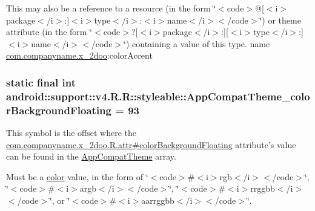 This may also be a reference to a resource (in the form \char`\"{}$<$code$>$@\mbox{[}$<$i$>$package$<$/i$>$:\mbox{]}$<$i$>$type$<$/i$>$:$<$i$>$name$<$/i$>$$<$/code$>$\char`\"{}) or theme attribute (in the form \char`\"{}$<$code$>$?\mbox{[}$<$i$>$package$<$/i$>$:\mbox{]}\mbox{[}$<$i$>$type$<$/i$>$:\mbox{]}$<$i$>$name$<$/i$>$$<$/code$>$\char`\"{}) containing a value of this type.  name \hyperlink{namespacecom_1_1companyname_1_1x__2doo}{com.companyname.x\_\-2doo}:colorAccent \hypertarget{classandroid_1_1support_1_1v4_1_1_r_1_1styleable_2345bf81c44b196ed19b9beae5d073b2}{
\subsubsection[{AppCompatTheme\_\-colorBackgroundFloating}]{\setlength{\rightskip}{0pt plus 5cm}static final int android::support::v4.R.R::styleable::AppCompatTheme\_\-colorBackgroundFloating = 93}}
\label{classandroid_1_1support_1_1v4_1_1_r_1_1styleable_2345bf81c44b196ed19b9beae5d073b2}


This symbol is the offset where the \hyperlink{classcom_1_1companyname_1_1x__2doo_1_1_r_1_1attr_693dff0b6dfa82e8f31b07a545c9aafd}{com.companyname.x\_\-2doo.R.attr\#colorBackgroundFloating} attribute's value can be found in the \hyperlink{classandroid_1_1support_1_1v4_1_1_r_1_1styleable_0873e92ba21076bb5a4aeadeb7f5779f}{AppCompatTheme} array.

Must be a \hyperlink{classandroid_1_1support_1_1v4_1_1_r_1_1color}{color} value, in the form of \char`\"{}$<$code$>$\#$<$i$>$rgb$<$/i$>$$<$/code$>$\char`\"{}, \char`\"{}$<$code$>$\#$<$i$>$argb$<$/i$>$$<$/code$>$\char`\"{}, \char`\"{}$<$code$>$\#$<$i$>$rrggbb$<$/i$>$$<$/code$>$\char`\"{}, or \char`\"{}$<$code$>$\#$<$i$>$aarrggbb$<$/i$>$$<$/code$>$\char`\"{}. 

